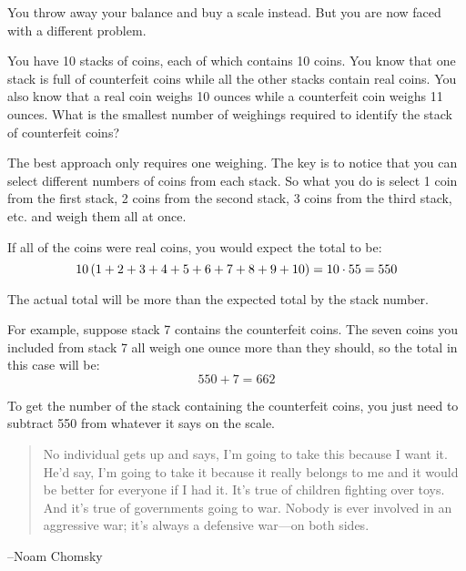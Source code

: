 \documentclass[letterpaper]{exam}
\begin{document}
\begin{questions}
\begin{solution}
        \end{solution}

      \question

        You throw away your balance and buy a scale instead.  But you are now faced with a different
        problem.  

        You have 10 stacks of coins, each of which contains 10 coins.  You know that one stack is full
        of counterfeit coins while all the other stacks contain real coins.  You also know that a real
        coin weighs 10 ounces while a counterfeit coin weighs 11 ounces.  What is the smallest number
        of weighings required to identify the stack of counterfeit coins?

        \begin{solution}

          The best approach only requires one weighing.  The key is to notice that you can select
          different numbers of coins from each stack.  So what you do is select 1 coin from the first
          stack, 2 coins from the second stack, 3 coins from the third stack, etc. and weigh them all at
          once.

          If all of the coins were real coins, you would expect the total to be: 
          \[ 
            10 \del{ 1 + 2 + 3 + 4 + 5 + 6 + 7 + 8 + 9 + 10 }  = 10 \cdot 55 = 550 
          \]

          The actual total will be more than the expected total by the stack number.  

          For example, suppose stack 7 contains the counterfeit coins.  The seven coins you included from
          stack 7 all weigh one ounce more than they should, so the total in this case will be: 
          \[ 
            550 + 7 = 662 
          \]

          To get the number of the stack containing the counterfeit coins, you just need to subtract 550
          from whatever it says on the scale.

        \end{solution}

  \end{questions}

  \ifprintanswers
  \else
    \vspace{6 cm}
    \begin{quote}
      \begin{em}
        No individual gets up and says, I'm going to take this because I want it. He'd say, I'm
        going to take it because it really belongs to me and it would be better for everyone if I
        had it. It's true of children fighting over toys. And it's true of governments going to war.
        Nobody is ever involved in an aggressive war; it's always a defensive war---on both sides.
      \end{em}
    \end{quote}
    \hspace{1 cm} --Noam Chomsky
  \fi
\end{document}
